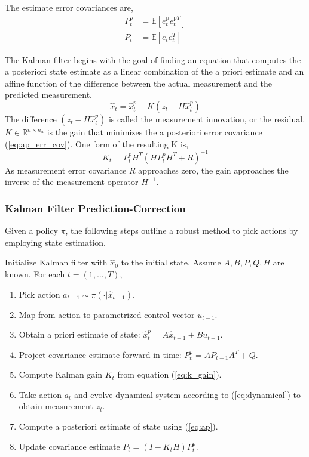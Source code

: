 \documentclass{article}
\begin{document}
The estimate error covariances are,
\begin{align}
	P^p_t &= \mathbb{E}\left[e^{\text{p}}_t e^{\text{p}T}_t \right]  \\
	P_t &= \mathbb{E}\left[e_t e_t^{T} \right] \label{eq:ap_err_cov}
\end{align}

The Kalman filter begins with the goal of finding an equation that computes the a posteriori state estimate as a linear combination of the a priori estimate and an affine function of the difference between the actual measurement and the predicted measurement.
\begin{equation}
	\hat{x}_t = \hat{x}_t^p + K(z_t - H\hat{x}_t^p)
	\label{eq:ap}
\end{equation}
The difference $(z_t - H\hat{x}_t^p)$ is called the measurement innovation, or the residual.  $K \in \mathbb{R}^{n \times n_u}$ is the gain that minimizes the a posteriori error covariance (\ref{eq:ap_err_cov}). One form of the resulting K \cite{maybeck1982stochastic} is, 
\begin{equation}
	K_t = P_t^p H^T(HP_t^pH^T + R)^{-1}
	\label{eq:k_gain}
\end{equation}
As measurement error covariance $R$ approaches zero, the gain approaches the inverse of the measurement operator $H^{-1}$. 

\subsubsection{Kalman Filter Prediction-Correction}
Given a policy $\pi$, the following steps outline a robust method to pick actions by employing state estimation. 

Initialize Kalman filter with $\hat{x}_0$ to the initial state. Assume $A, B, P, Q, H$ are known. For each $t = (1, \ldots, T)$, 
\begin{enumerate}
	\item Pick action $a_{t-1} \sim \pi(\cdot | \hat{x}_{t-1})$. 
	\item Map from action to parametrized control vector $u_{t-1}$.
	\item Obtain a priori estimate of state: $\hat{x}_t^p = A\hat{x}_{t-1} + Bu_{t-1}$.
	\item Project covariance estimate forward in time: $P_{t}^p = AP_{t-1}A^T + Q$.
	\item Compute Kalman gain $K_t$ from equation (\ref{eq:k_gain}).
	\item Take action $a_t$ and evolve dynamical system according to (\ref{eq:dynamical}) to obtain measurement $z_t$.
	\item Compute a posteriori estimate of state using (\ref{eq:ap}).
	\item Update covariance estimate $P_t = (I - K_tH)P_t^p$.
\end{enumerate}
\end{document}
